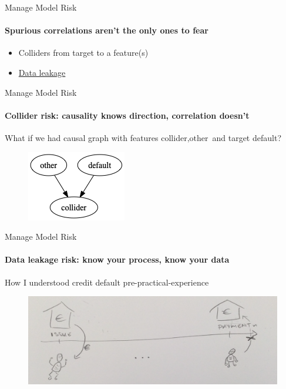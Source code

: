 \begin{frame}{Manage Model Risk}
    \framesubtitle{Spurious correlations aren't the only ones to fear}
    \begin{itemize}
        \item Colliders from target to a feature(s)
        \item \href{https://en.wikipedia.org/wiki/Leakage\_(machine\_learning)}{Data leakage}
    \end{itemize}

\end{frame}

\begin{frame}{Manage Model Risk}
    \framesubtitle{Collider risk: causality knows direction, correlation doesn't}
    What if we had causal graph with features \textrm{collider}$, \textrm{other}$ and target \textrm{default}?
    \newline
    \begin{figure}[ht]
        \includegraphics[height=0.5\textheight]{graphics/default_fork}
    \end{figure}
\end{frame}

\begin{frame}{Manage Model Risk}
    \framesubtitle{Data leakage risk: know your process, know your data}
    How I understood credit default pre-practical-experience
    \newline
    \begin{figure}[ht]
        \includegraphics[height=0.5\textheight]{graphics/default-process-start}
    \end{figure}

\end{frame}

